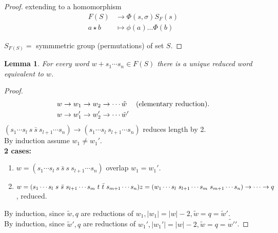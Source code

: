 \documentclass{article}
\let\ddd\cdots
\newtheorem{lemma}[theorem]{Lemma}
\theoremstyle{definition}
\theoremstyle{remark}
\theoremstyle{example}
\begin{document}
\begin{proof}
		extending to a homomorphism \begin{align*}
			F(S) & \to \Phi(s, \sigma) S_F(s)\\
			a \star b &\mapsto \phi(a) \dotso \Phi(b)
		\end{align*}
		
		$S_{F(S)} = $ symmmetric group (permutations) of set $S$.
		\end{proof}
	
		\begin{lemma}
			For every word $w+s_1 \ddd s_n \in F(S)$ there is a unique reduced word equivalent to $w$. 
		\end{lemma}
	
		\begin{proof}
			\begin{align*}
			w \to w_1 \to w_2  & \to \ddd \tilde{w} & (\mathrm{elementary\ reduction}).\\
			w \to w_1' \to w_2' & \to \ddd \tilde{w}' & \null\\
			\end{align*}
			$(s_1 \ddd s_l \ s \ \bar{s} \ s_{l+1} \ddd s_n) \to (s_1 \ddd s_l \ s_{l+1} \ddd s_n)$ reduces length by 2.\\
			
			By induction assume $w_1 \neq w_1'$.\\
			\textbf{2 cases:}
			\begin{enumerate}
				\item $w=(s_1 \ddd s_l \ s \ \bar{s} \ s \ s_{l+1} \ddd s_n)$ overlap $w_1 = w_1'$.
				\item $w = (s_1 \ddd s_l \ s \ \bar{s} \ s_{l+1} \ddd s_m \ t \ \bar{t} \ s_{m+1} \ddd s_n)\\
				z=(w_1 \ddd s_l \ s_{l+1} \ddd s_m \ s_{m+1} \ddd s_n) \to \ddd \to q$, reduced.
				
			\end{enumerate}
		
			By induction, since $\tilde{w}, q$ are reductions of $w_1, |w_1|=|w|-2, \tilde{w}=q = \tilde{w}'$.\\
			By induction, since $\tilde{w}', q$ are reductions of $w_1', |w_1'|=|w|-2, \tilde{w}=q = \tilde{w'}'$.
		\end{proof}
	
\end{document}
